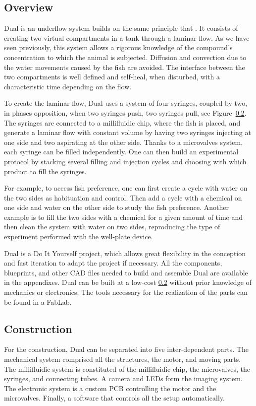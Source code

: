   \subsection{Overview}
  Dual is an underflow system builds on the same principle that \cite{readman2013fish}. It consists of creating two virtual compartments in a tank through a laminar flow. As we have seen previously, this system allows a rigorous knowledge of the compound's concentration to which the animal is subjected. Diffusion and convection due to the water movements caused by the fish are avoided. The interface between the two compartments is well defined and self-heal, when disturbed, with a characteristic time depending on the flow.

  To create the laminar flow, Dual uses a system of four syringes, coupled by two, in phases opposition, when two syringes push, two syringes pull, see Figure~\ref{}. The syringes are connected to a millifluidic chip, where the fish is placed, and generate a laminar flow with constant volume by having two syringes injecting at one side and two aspirating at the other side. Thanks to a microvalves system, each syringe can be filled independently. One can then build an experimental protocol by stacking several filling and injection cycles and choosing with which product to fill the syringes.

  For example, to access fish preference, one can first create a cycle with water on the two sides as habituation and control. Then add a cycle with a chemical on one side and water on the other side to study the fish preference. Another example is to fill the two sides with a chemical for a given amount of time and then clean the system with water on two sides, reproducing the type of experiment performed with the well-plate device.

  Dual is a Do It Yourself project, which allows great flexibility in the conception and fast iteration to adapt the project if necessary. All the components, blueprints, and other CAD files needed to build and assemble Dual are available in the appendixes. Dual can be built at a low-cost \ref{} without prior knowledge of mechanics or electronics. The tools necessary for the realization of the parts can be found in a FabLab.

  \subsection{Construction}
  For the construction, Dual can be separated into five inter-dependent parts. The mechanical system comprised all the structures, the motor, and moving parts. The millifluidic system is constituted of the millifluidic chip, the microvalves, the syringes, and connecting tubes.  A camera and LEDs form the imaging system. The electronic system is a custom PCB controlling the motor and the microvalves. Finally, a software that controls all the setup automatically.

